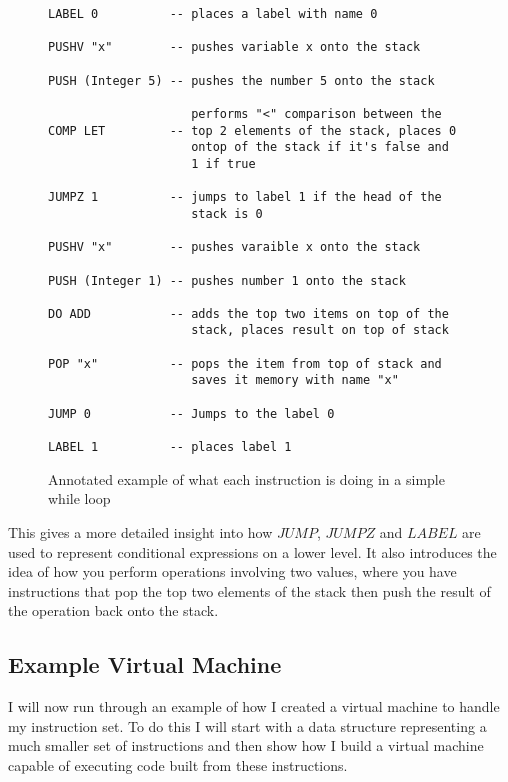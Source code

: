 \begin{figure}[h]
\centering
\begin{lstlisting}[basicstyle=\ttfamily\small]
LABEL 0	         -- places a label with name 0 

PUSHV "x"        -- pushes variable x onto the stack 

PUSH (Integer 5) -- pushes the number 5 onto the stack 

                    performs "<" comparison between the 
COMP LET         -- top 2 elements of the stack, places 0 
                    ontop of the stack if it's false and 
                    1 if true   
	                    
JUMPZ 1          -- jumps to label 1 if the head of the 
                    stack is 0 
	
PUSHV "x"        -- pushes varaible x onto the stack
	
PUSH (Integer 1) -- pushes number 1 onto the stack
	
DO ADD           -- adds the top two items on top of the
                    stack, places result on top of stack

POP "x"          -- pops the item from top of stack and
                    saves it memory with name "x"

JUMP 0           -- Jumps to the label 0         

LABEL 1          -- places label 1 			
\end{lstlisting}
\caption{Annotated example of what each instruction is doing in a simple while loop}
\label{fig:whileExp} 
\end{figure}

This gives a more detailed insight into how $JUMP$, $JUMPZ$ and $LABEL$ are used to represent conditional expressions on a lower level. It also introduces the idea of how you perform operations involving two values, where you have instructions that pop the top two elements of the stack then push the result of the operation back onto the stack.

\subsection{Example Virtual Machine}
\label{sec:exmpCodeExec}
I will now run through an example of how I created a virtual machine to handle my instruction set. To do this I will start with a data structure representing a much smaller set of instructions and then show how I build a virtual machine capable of executing code built from these instructions.

